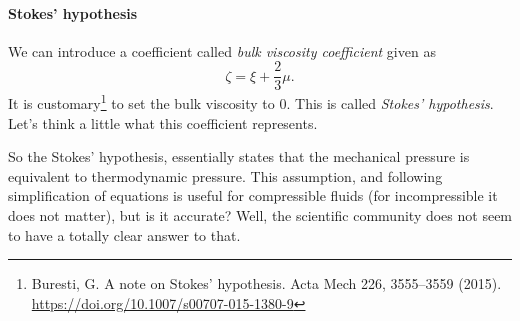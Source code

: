 \documentclass[a4paper]{article}
\begin{document}
\paragraph{Stokes' hypothesis}
We can introduce a coefficient called \emph{bulk viscosity coefficient} given
as
\[
	\zeta = \xi + \dfrac{2}{3}\mu.
\]
It is customary\footnote{Buresti, G. A note on Stokes’ hypothesis. Acta Mech 226,
	3555–3559 (2015). \url{https://doi.org/10.1007/s00707-015-1380-9}} to set the
bulk viscosity to 0. This is called \emph{Stokes' hypothesis}. Let's think a
little what this coefficient represents.
\begin{quote}
	\footnotemark[\value{footnote}]
\end{quote}
So the Stokes' hypothesis, essentially states that the mechanical pressure is
equivalent to thermodynamic pressure. This assumption, and following
simplification of equations is useful for compressible fluids (for
incompressible it does not matter), but is it accurate? Well, the scientific
community does not seem to have a totally clear answer to that.
\end{document}
